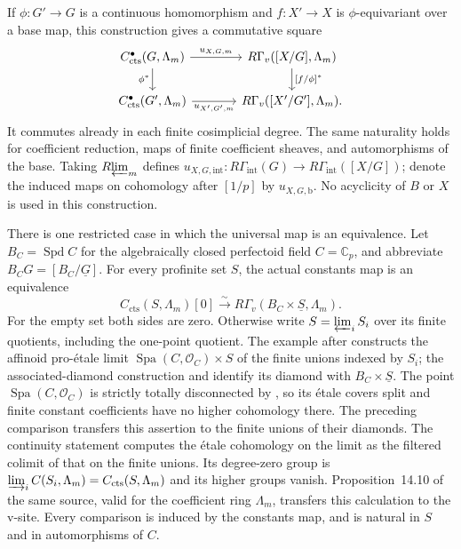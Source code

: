\documentclass[11pt]{article}
\numberwithin{equation}{section}
\theoremstyle{definition}
\theoremstyle{remark}
\begin{document}
If $\phi:G'\to G$ is a continuous homomorphism and $f:X'\to X$ is
$\phi$-equivariant over a base map, this construction gives a
commutative square
\begin{equation}\label{eq:constant-cochain-naturality}
\begin{tikzcd}[column sep=large]
 C_{\mathrm{cts}}^{\bullet}(G,\Lambda_m)
     \arrow[r,"u_{X,G,m}"] \arrow[d,"\phi^*"']
   &R\Gamma_v([X/G],\Lambda_m)\arrow[d,"{[f/\phi]^*}"]\\
 C_{\mathrm{cts}}^{\bullet}(G',\Lambda_m)
     \arrow[r,"u_{X',G',m}"']
   &R\Gamma_v([X'/G'],\Lambda_m).
\end{tikzcd}
\end{equation}
It commutes already in each finite cosimplicial degree.  The same
naturality holds for coefficient reduction, maps of finite coefficient
sheaves, and automorphisms of the base.  Taking $R\!\varprojlim_m$ defines
$u_{X,G,\mathrm{int}}:R\Gamma_{\mathrm{int}}(G)\to
R\Gamma_{\mathrm{int}}([X/G])$; denote the induced maps on cohomology
after $[1/p]$ by $u_{X,G,\mathrm b}$.  No acyclicity of $B$ or $X$
is used in this construction.

There is one restricted case in which the universal map is an
equivalence.  Let $B_C=\operatorname{Spd} C$ for the algebraically closed perfectoid
field $C=\mathbb C_p$, and abbreviate $B_CG=[B_C/\underline G]$.
For every profinite set $S$, the actual constants map
is an equivalence
\begin{equation}\label{eq:geometric-point-constants}
 C_{\mathrm{cts}}(S,\Lambda_m)[0]\xrightarrow{\ \sim\ }
       R\Gamma_v(B_C\times\underline S,\Lambda_m).
\end{equation}
For the empty set both sides are zero.  Otherwise write $S=\varprojlim_i S_i$
over its finite quotients, including the one-point quotient.  The example
after \cite[Definition~7.8]{ScholzeDiamonds} constructs the affinoid
pro-\'etale limit $\operatorname{Spa}(C,\mathcal O_C)\times S$ of the finite
unions indexed by $S_i$; the associated-diamond construction and
\cite[Example~11.12 and Lemma~15.2]{ScholzeDiamonds} identify its
diamond with $B_C\times\underline S$.
The point $\operatorname{Spa}(C,\mathcal O_C)$ is strictly totally disconnected
by \cite[Definition~7.15 and Proposition~7.16]{ScholzeDiamonds}, so its
\'etale covers split and finite constant coefficients have no higher
cohomology there.  The preceding \cite[Lemma~15.6]{ScholzeDiamonds}
comparison transfers this assertion to the finite unions of their
diamonds.  The continuity statement
\cite[Proposition~14.9]{ScholzeDiamonds} computes the \'etale
cohomology on the limit as the filtered colimit of that on the finite
unions.  Its degree-zero group is
$\varinjlim_i C(S_i,\Lambda_m)=C_{\mathrm{cts}}(S,\Lambda_m)$ and its higher
groups vanish.  Proposition~14.10 of the same source, valid for the
coefficient ring $\Lambda_m$, transfers this calculation to the v-site.
Every comparison is induced by the constants map, and is natural in
$S$ and in automorphisms of $C$.
\end{document}

